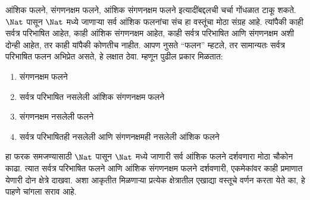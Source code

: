 \documentclass[../../../include/open-logic-section]{subfiles}
\begin{document}
आंशिक फलने, संगणनक्षम फलने, आंशिक संगणनक्षम फलने इत्यादींबद्दलची
चर्चा गोंधळात टाकू शकते. $\Nat$ पासून $\Nat$ मध्ये जाणाऱ्या सर्व
आंशिक फलनांचा संच हा वस्तूंचा मोठा संग्रह आहे. त्यांपैकी काही
सर्वत्र परिभाषित आहेत, काही आंशिक संगणनक्षम आहेत, काही सर्वत्र
परिभाषित आणि संगणनक्षम अशी दोन्ही आहेत, तर काही यांपैकी कोणतीच नाहीत.
आपण नुसते ``फलन'' म्हटले, तर सामान्यतः सर्वत्र परिभाषित फलन अभिप्रेत
असते, हे लक्षात ठेवा. म्हणून पुढील प्रकार मिळतात:
\begin{enumerate}
\item संगणनक्षम फलने
\item सर्वत्र परिभाषित नसलेली आंशिक संगणनक्षम फलने
\item संगणनक्षम नसलेली फलने
\item सर्वत्र परिभाषितही नसलेली आणि संगणनक्षमही नसलेली आंशिक फलने
\end{enumerate}
हा फरक समजण्यासाठी $\Nat$ पासून $\Nat$ मध्ये जाणारी सर्व आंशिक
फलने दर्शवणारा मोठा चौकोन काढा. त्यात सर्वत्र परिभाषित फलने
आणि आंशिक संगणनक्षम फलने दर्शवणारी, एकमेकांवर काही प्रमाणात
येणारी दोन क्षेत्रे दाखवा. अशा आकृतीत मिळणाऱ्या प्रत्येक
क्षेत्रातील एखाद्या वस्तूचे वर्णन करता येते का, हे पाहणे चांगला सराव आहे.
\end{document}
